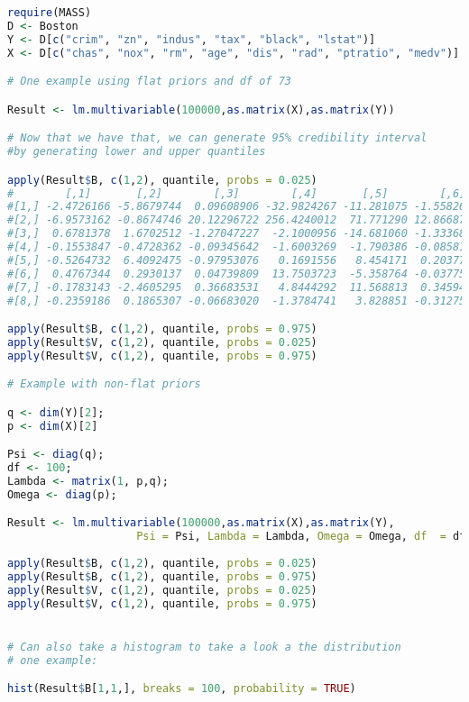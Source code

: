 \documentclass[english]{report}
\begin{document}
\begin{lstlisting}[frame=single, language=R]
require(MASS)
D <- Boston
Y <- D[c("crim", "zn", "indus", "tax", "black", "lstat")]
X <- D[c("chas", "nox", "rm", "age", "dis", "rad", "ptratio", "medv")]

# One example using flat priors and df of 73

Result <- lm.multivariable(100000,as.matrix(X),as.matrix(Y))

# Now that we have that, we can generate 95% credibility interval
#by generating lower and upper quantiles

apply(Result$B, c(1,2), quantile, probs = 0.025)
#        [,1]       [,2]        [,3]        [,4]       [,5]        [,6]
#[1,] -2.4726166 -5.8679744  0.09608906 -32.9824267 -11.281075 -1.55826198
#[2,] -6.9573162 -0.8674746 20.12296722 256.4240012  71.771290 12.86687197
#[3,]  0.6781378  1.6702512 -1.27047227  -2.1000956 -14.681060 -1.33368492
#[4,] -0.1553847 -0.4728362 -0.09345642  -1.6003269  -1.790386 -0.08581789
#[5,] -0.5264732  6.4092475 -0.97953076   0.1691556   8.454171  0.20377180
#[6,]  0.4767344  0.2930137  0.04739809  13.7503723  -5.358764 -0.03775675
#[7,] -0.1783143 -2.4605295  0.36683531   4.8444292  11.568813  0.34594612
#[8,] -0.2359186  0.1865307 -0.06683020  -1.3784741   3.828851 -0.31275303

apply(Result$B, c(1,2), quantile, probs = 0.975)
apply(Result$V, c(1,2), quantile, probs = 0.025)
apply(Result$V, c(1,2), quantile, probs = 0.975)

# Example with non-flat priors

q <- dim(Y)[2];
p <- dim(X)[2]

Psi <- diag(q);
df <- 100;
Lambda <- matrix(1, p,q);
Omega <- diag(p);

Result <- lm.multivariable(100000,as.matrix(X),as.matrix(Y), 
                    Psi = Psi, Lambda = Lambda, Omega = Omega, df  = df)
                    
apply(Result$B, c(1,2), quantile, probs = 0.025)
apply(Result$B, c(1,2), quantile, probs = 0.975)
apply(Result$V, c(1,2), quantile, probs = 0.025)
apply(Result$V, c(1,2), quantile, probs = 0.975)


# Can also take a histogram to take a look a the distribution
# one example:

hist(Result$B[1,1,], breaks = 100, probability = TRUE)

\end{lstlisting}
\end{document}
